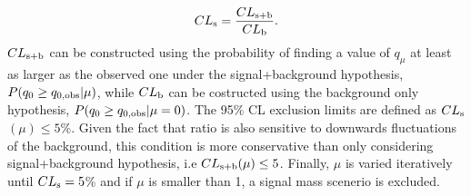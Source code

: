  \begin{equation}
\label{uplim}
  CL_{\rm s}=\frac{CL_{\rm s+b}}{CL_{\rm b}}.
\end{equation}
$CL_{\rm s+b}$ can be constructed using the probability of finding a value of $q_\mu$ at least as larger as the observed one under the signal+background hypothesis, $P(q_0\geq q_{0,\rm obs}|\mu)$, while $CL_{\rm b}$ can be costructed using the background only hypothesis, $P(q_0\geq q_{0,\rm obs}|\mu=0)$.
The 95\% CL exclusion limits are defined as $CL_{\rm s}$$(\mu)\leq5$\%. 
Given the fact that ratio is also sensitive to downwards fluctuations of the background, this condition is more conservative than only considering signal+background hypothesis, i.e $CL_{\rm s+b}(\mu)\leq5$.  
Finally, $\mu$ is varied iteratively until  $CL_{\rm s}=5$\% and if $\mu$ is smaller than 1, a signal mass scenerio is excluded.

